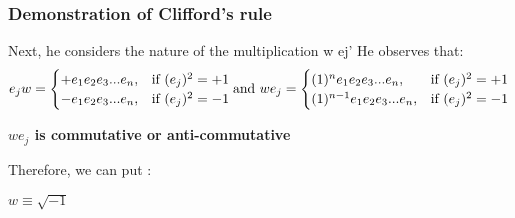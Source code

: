 \begin{frame}\frametitle{Demonstration of Clifford’s rule }

 Next, he considers the nature of the multiplication w ej' He observes that:\\
\[
   e_j w = 
\begin{cases}
+ e_1 e_2 e_3 ...e_n,& \text{if } (e_j)^2 = + 1\\
- e_1 e_2 e_3 ...e_n,              &  \text{if } (e_j)^2 = - 1
\end{cases}
\\ 
\text{and }\\
    w e_j= 
\begin{cases}
(1)^n e_1 e_2 e_3 ...e_n,& \text{if } (e_j)^2 = + 1\\
(1)^{n-1} e_1 e_2 e_3 ...e_n,              &  \text{if } (e_j)^2 = - 1
\end{cases}

\]

 
\textbf{ $w e_j $ is commutative or anti-commutative }
 

Therefore, we can put :\\
\begin{center}
	$w \equiv \sqrt{-1}$ 
\end{center}
\end{frame}



